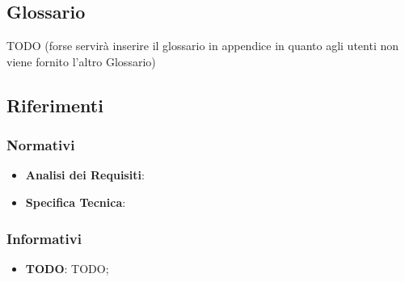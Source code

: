 	\subsection{Glossario} %
	\label{sub:glossario}
	TODO (forse servirà inserire il glossario in appendice in quanto agli utenti non viene fornito l'altro Glossario) \newline
	\glossarioDesc

	\subsection{Riferimenti} %
	\label{sub:riferimenti}
		\subsubsection{Normativi} %
		\label{ssub:normativi}
			\begin{itemize}
				\item \textbf{Analisi dei Requisiti}: \docNameVersionAdR
				\item \textbf{Specifica Tecnica}: \docNameVersionST
			\end{itemize}

		\subsubsection{Informativi} %
		\label{ssub:informativi}
			\begin{itemize}
				\item \textbf{TODO}: TODO;
			\end{itemize}
